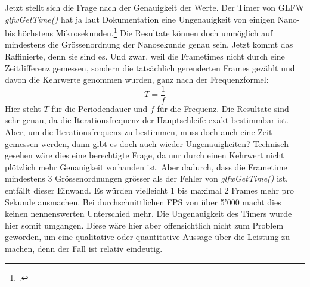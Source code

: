 \documentclass[titlepage, 11pt, a4paper, ngerman]{article}
\begin{document}
Jetzt stellt sich die Frage nach der Genauigkeit der Werte. Der Timer von GLFW \textit{glfwGetTime()} hat ja laut Dokumentation eine Ungenauigkeit von einigen Nano- bis höchstens Mikrosekunden.\footcite{glfwGetTimeDoc} Die Resultate können doch unmöglich auf mindestens die Grössenordnung der Nanosekunde genau sein. Jetzt kommt das Raffinierte, denn sie sind es. Und zwar, weil die \glspl{Frametime} nicht durch eine Zeitdifferenz gemessen, sondern die tatsächlich gerenderten \glspl{Frame} gezählt und davon die Kehrwerte genommen wurden, ganz nach der Frequenzformel:
$$T = \frac{1}{f}$$
Hier steht $T$ für die Periodendauer und $f$ für die Frequenz. Die Resultate sind sehr genau, da die Iterationsfrequenz der Hauptschleife exakt bestimmbar ist. Aber, um die Iterationsfrequenz zu bestimmen, muss doch auch eine Zeit gemessen werden, dann gibt es doch auch wieder Ungenauigkeiten? Technisch gesehen wäre dies eine berechtigte Frage, da nur durch einen Kehrwert nicht plötzlich mehr Genauigkeit vorhanden ist. Aber dadurch, dass die \gls{Frametime} mindestens 3 Grössenordnungen grösser als der Fehler von \textit{glfwGetTime()} ist, entfällt dieser Einwand. Es würden vielleicht 1 bis maximal 2 \glspl{Frame} mehr pro Sekunde ausmachen. Bei durchschnittlichen \acrshort{FPS} von über 5'000 macht dies keinen nennenswerten Unterschied mehr. Die Ungenauigkeit des Timers wurde hier somit umgangen. Diese wäre hier aber offensichtlich nicht zum Problem geworden, um eine qualitative oder quantitative Aussage über die Leistung zu machen, denn der Fall ist relativ eindeutig.
\end{document}
